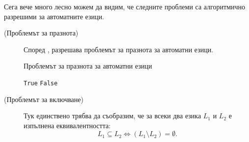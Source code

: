 Сега вече много лесно можем да видим, че следните проблеми са алгоритмично разрешими за автоматните езици.
\begin{description}
\item[(Проблемът за празнота)]
  Според ,  разрешава проблемът за празнота за автоматни езици.
  \begin{algorithm}[H]
    \caption{Проблемът за празнота за автоматни езици}
    \label{alg:regular:pumping-applications:emptiness}
    \begin{algorithmic}[1]
      \State \Return \texttt{True}
      \EndIf
      \EndFor
      \EndFor
      \State \Return \texttt{False}
      \EndProcedure
    \end{algorithmic}
  \end{algorithm}
\item[(Проблемът за включване)]
  Тук единствено трябва да съобразим, че за всеки два езика $L_1$ и $L_2$ е изпълнена еквивалентността:
  \[L_1 \subseteq L_2 \iff (L_1\setminus L_2) = \emptyset.\]
  

\end{description}
